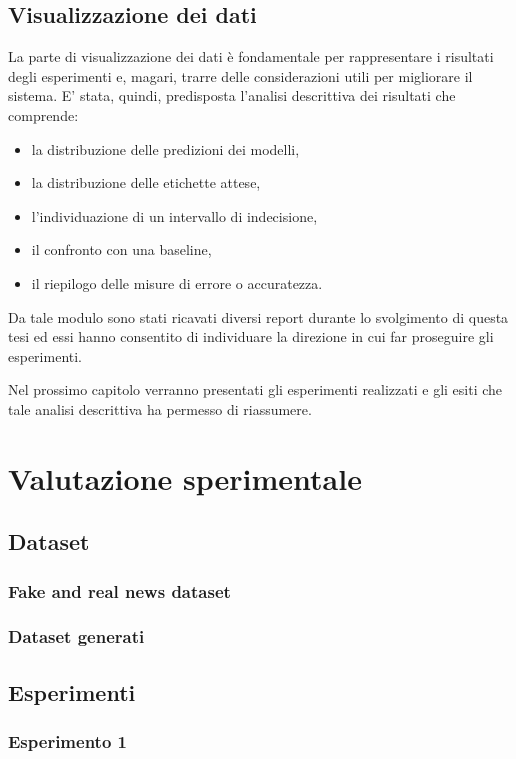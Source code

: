 \documentclass[12pt]{report}
\theoremstyle{definition}
\begin{document}
\section{Visualizzazione dei dati}\label{datavisualizationimpl}
La parte di visualizzazione dei dati è fondamentale per rappresentare i risultati degli esperimenti e, magari, trarre delle considerazioni utili per migliorare il sistema. E' stata, quindi, predisposta l'analisi descrittiva dei risultati che comprende:
\begin{itemize}
    \item la distribuzione delle predizioni dei modelli,
    \item la distribuzione delle etichette attese,
    \item l'individuazione di un intervallo di indecisione,
    \item il confronto con una baseline,
    \item il riepilogo delle misure di errore o accuratezza.
\end{itemize}
Da tale modulo sono stati ricavati diversi report durante lo svolgimento di questa tesi ed essi hanno consentito di individuare la direzione in cui far proseguire gli esperimenti.

Nel prossimo capitolo verranno presentati gli esperimenti realizzati e gli esiti che tale analisi descrittiva ha permesso di riassumere.

\chapter{Valutazione sperimentale}
\label{Capitolo 4}
\onehalfspacing
\section{Dataset}
\subsection{Fake and real news dataset}
\subsection{Dataset generati}
\section{Esperimenti}
\subsection{Esperimento 1}
\end{document}

